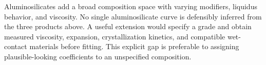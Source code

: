 Aluminosilicates add a broad composition space with varying modifiers, liquidus behavior, and viscosity. No single aluminosilicate curve is defensibly inferred from the three products above. A useful extension would specify a grade and obtain measured viscosity, expansion, crystallization kinetics, and compatible wet-contact materials before fitting. This explicit gap is preferable to assigning plausible-looking coefficients to an unspecified composition.
